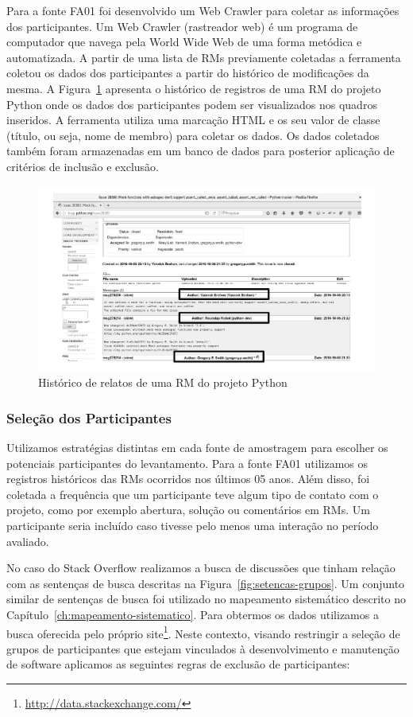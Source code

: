 Para a fonte FA01 foi desenvolvido um Web Crawler para coletar as informações
dos participantes. Um Web Crawler (rastreador web) é um programa de computador
que navega pela World Wide Web de uma forma metódica e automatizada. A partir
de uma lista de RMs previamente coletadas a ferramenta coletou os dados dos
participantes a partir do histórico de modificações da mesma. A
Figura~\ref{fig:historico-rm-python} apresenta o histórico de registros de uma
RM do projeto Python onde os dados dos participantes podem ser visualizados nos
quadros inseridos. A ferramenta utiliza uma marcação HTML e os seu valor de
classe (título, ou seja, nome de membro) para coletar os dados. Os dados
coletados também foram armazenadas em um banco de dados para posterior aplicação
de critérios de inclusão e exclusão.

\begin{figure}[htpb]
	\centering
	\includegraphics[width=0.6\linewidth]{./chapter-pesquisa-com-profissionais/img/historico-rm-python.pdf}
	\caption{Histórico de relatos de uma RM do projeto Python}
\label{fig:historico-rm-python}
\end{figure}

\subsubsection{Seleção dos Participantes}
\label{subsubsec:pesquisa_profissionais_plano_pesquisa}

Utilizamos estratégias distintas em cada fonte de amostragem para escolher os
potenciais participantes do levantamento. Para a fonte FA01 utilizamos os
registros históricos das RMs ocorridos nos últimos 05 anos. Além disso, foi
coletada a frequência que um participante teve algum tipo de contato com o
projeto, como por exemplo abertura, solução ou comentários em RMs. Um
participante seria incluído caso tivesse pelo menos uma interação no período
avaliado.

No caso do Stack Overflow realizamos a busca de discussões que tinham relação
com as sentenças de busca descritas na Figura~\ref{fig:setencas-grupos}. Um
conjunto similar de sentenças de busca foi utilizado no mapeamento sistemático
descrito no Capítulo~\ref{ch:mapeamento-sistematico}. Para obtermos os dados
utilizamos a busca oferecida pelo próprio
site\footnote{\url{http://data.stackexchange.com/}}. Neste contexto, visando
restringir a seleção de grupos de participantes que estejam vinculados à
desenvolvimento e manutenção de software aplicamos as seguintes regras de
exclusão de participantes:

